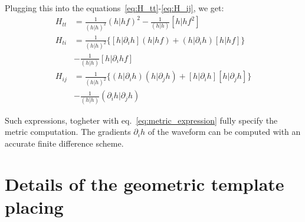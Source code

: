 \documentclass[twocolumn,showpacs,preprintnumbers,nofootinbib,prd,
superscriptaddress,10pt]{revtex4-1}
\newcommand{\rescalar}[2]{( #1|#2 )}
\newcommand{\imscalar}[2]{[ #1|#2 ]}
\begin{document}
Plugging this into the equations~\eqref{eq:H_tt}-\eqref{eq:H_ij}, we get:
\begin{align}
	H_{tt} &= \frac{1}{\rescalar{h}{h}^{2}} \rescalar{{h}}{{h}f}^2 - \frac{1}{\rescalar{h}{h}} \imscalar{h}{{h} f^2 } \label{eq:H_tt_grad} \\
	H_{ti} &= \frac{1}{\rescalar{h}{h}^{2}} \Big\{ \imscalar{h}{\partial_i {h}} \rescalar{{h}}{{h}f} +\rescalar{h}{\partial_i {h}} \imscalar{h}{hf} \Big\} \nonumber \\
	&- \frac{1}{\rescalar{h}{h}} \imscalar{h}{\partial_i{h} f } \label{eq:H_ti_grad} \\
	H_{ij} &=  \frac{1}{\rescalar{h}{h}^{2}} \Big\{ \rescalar{h}{\partial_i {h}} \rescalar{{h}}{\partial_j {h}} +\imscalar{h}{\partial_i {h}} \imscalar{h}{\partial_j {h}} \Big\} \nonumber \\
	&- \frac{1}{\rescalar{h}{h}} \rescalar{\partial_i h}{\partial_j {h}} \label{eq:H_ij_grad} 
\end{align}

Such expressions, togheter with eq.~\eqref{eq:metric_expression} fully specify the metric computation.
The gradients $\partial_i h$ of the waveform can be computed with an accurate finite difference scheme.



\section{Details of the geometric template placing}\label{app:placing}

\blindtext
\blindtext
	
	
\end{document}

